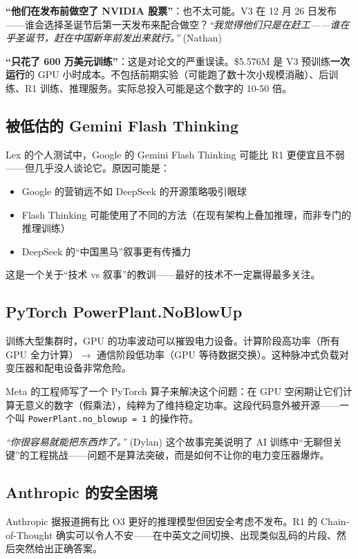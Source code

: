 \documentclass[a4paper]{article}
\begin{document}
\textbf{``他们在发布前做空了 NVIDIA 股票''}：也不太可能。V3 在 12 月 26 日发布——谁会选择圣诞节后第一天发布来配合做空？\textit{``我觉得他们只是在赶工——谁在乎圣诞节，赶在中国新年前发出来就行。''} (Nathan)

\textbf{``只花了 600 万美元训练''}：这是对论文的严重误读。\$5.576M 是 V3 预训练\textbf{一次运行}的 GPU 小时成本。不包括前期实验（可能跑了数十次小规模消融）、后训练、R1 训练、推理服务。实际总投入可能是这个数字的 10-50 倍。

\subsection{被低估的 Gemini Flash Thinking}

Lex 的个人测试中，Google 的 Gemini Flash Thinking 可能比 R1 更便宜且不弱——但几乎没人谈论它。原因可能是：
\begin{itemize}
    \item Google 的营销远不如 DeepSeek 的开源策略吸引眼球
    \item Flash Thinking 可能使用了不同的方法（在现有架构上叠加推理，而非专门的推理训练）
    \item DeepSeek 的``中国黑马''叙事更有传播力
\end{itemize}

这是一个关于``技术 vs 叙事''的教训——最好的技术不一定赢得最多关注。

\subsection{PyTorch PowerPlant.NoBlowUp}

训练大型集群时，GPU 的功率波动可以摧毁电力设备。计算阶段高功率（所有 GPU 全力计算）$\to$ 通信阶段低功率（GPU 等待数据交换）。这种脉冲式负载对变压器和配电设备非常危险。

Meta 的工程师写了一个 PyTorch 算子来解决这个问题：在 GPU 空闲期让它们计算无意义的数字（假乘法），纯粹为了维持稳定功率。这段代码意外被开源——一个叫 \texttt{PowerPlant.no\_blowup = 1} 的操作符。

\textit{``你很容易就能把东西炸了。''} (Dylan) 这个故事完美说明了 AI 训练中``无聊但关键''的工程挑战——问题不是算法突破，而是如何不让你的电力变压器爆炸。

\subsection{Anthropic 的安全困境}

Anthropic 据报道拥有比 O3 更好的推理模型但因安全考虑不发布。R1 的 Chain-of-Thought 确实可以令人不安——在中英文之间切换、出现类似乱码的片段、然后突然给出正确答案。
\end{document}

